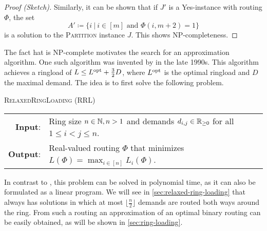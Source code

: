 \begin{proof}[Proof (Sketch)]
	Similarly, it can be shown that if $J'$ is a Yes-instance with routing $\Phi$, the set 
	\begin{equation}
		A' \coloneqq \{i \ |\ i \in [m] \text{ and } \Phi(i, m+2) = 1\}
	\end{equation} 
	is a solution to the \textsc{Partition} instance $J$.
	This shows NP-completeness.
\end{proof}



The fact hat \RL is NP-complete motivates the search for an approximation algorithm.
One such algorithm was invented by \citet{schrijver99} in the late 1990s.
This algorithm achieves a ringload of $L \leq L^{\mathrm{opt}} + \frac{3}{2}D$, where $L^{\mathrm{opt}}$ is the optimal ringload and $D$ the maximal demand.
The idea is to first solve the following problem.
\begin{center}
	\begin{mdframed}
		\centering
		\textsc{RelaxedRingLoading} (\textsc{RRL})\\[0.7em]
		\begin{tabular}{rl}
			{\bfseries Input}: & Ring size $n \in \mathbb{N}, n > 1$ and demands $d_{i, j} \in \mathbb{R}_{\geq 0}$ for all $1 \leq i<j\leq n$.\\
			{\bfseries Output}: & Real-valued routing $\Phi$ that minimizes $L(\Phi) = \max_{i \in [n]} L_i(\Phi)$.
		\end{tabular}
	\end{mdframed}
\end{center}
In contrast to \RL, this problem can be solved in polynomial time, as it can also be formulated as a linear program.
We will see in \cref{sec:relaxed-ring-loading} that \RRL always has solutions in which at most $\lfloor \frac{n}{2} \rfloor$ demands are routed both ways around the ring.
From such a routing an approximation of an optimal binary routing can be easily obtained, as will be shown in \cref{sec:ring-loading}.

